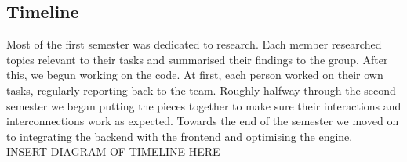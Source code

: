 \subsection{Timeline}
Most of the first semester was dedicated to research. Each member researched topics relevant to their tasks and summarised their findings to the group. After this, we begun working on the code. At first, each person worked on their own tasks, regularly reporting back to the team. Roughly halfway through the second semester we began putting the pieces together to make sure their interactions and interconnections work as expected. 
Towards the end of the semester we moved on to integrating the backend with the frontend and optimising the engine.\\
INSERT DIAGRAM OF TIMELINE HERE 
